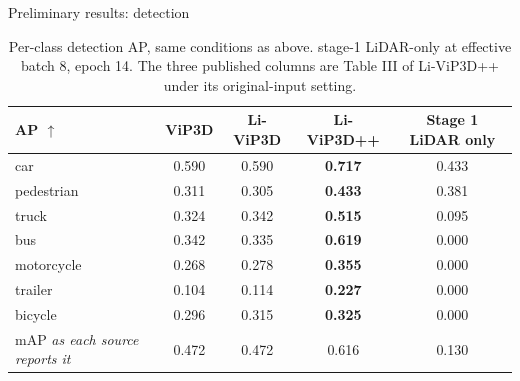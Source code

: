 \documentclass[aspectratio=169,11pt,t]{beamer}
\newcommand{\refcite}[1]{\textcolor{tuered}{\scriptsize\cite{#1}}}
\newcommand{\up}{$\uparrow$}
\begin{document}
\begin{frame}{Preliminary results: detection}
  \footnotesize
  \begin{table}
    \centering
    \caption{Per-class detection AP, same conditions as above. stage-1 LiDAR-only at effective batch 8, epoch 14. The three published
      columns are Table III of Li-ViP3D++\refcite{Halinkovic2026LiViP3DPP}
      under its original-input setting.}
    \scriptsize
    \setlength{\tabcolsep}{5pt}
    \begin{tabular}{lccc|c}
      \toprule
      AP \up & ViP3D\refcite{Gu2023ViP3D} & Li-ViP3D\refcite{Halinkovic2025LiViP3D}
             & Li-ViP3D++\refcite{Halinkovic2026LiViP3DPP} & \textbf{Stage 1 LiDAR only} \\
      \midrule
      car         & 0.590 & 0.590 & \textbf{0.717} & 0.433 \\
      pedestrian  & 0.311 & 0.305 & \textbf{0.433} & 0.381 \\
      truck       & 0.324 & 0.342 & \textbf{0.515} & 0.095 \\
      bus         & 0.342 & 0.335 & \textbf{0.619} & \alert{0.000} \\
      motorcycle  & 0.268 & 0.278 & \textbf{0.355} & \alert{0.000} \\
      trailer     & 0.104 & 0.114 & \textbf{0.227} & \alert{0.000} \\
      bicycle     & 0.296 & 0.315 & \textbf{0.325} & \alert{0.000} \\
      \midrule
      mAP \emph{as each source reports it} & 0.472 & 0.472 & 0.616 & 0.130 \\
      \bottomrule
    \end{tabular}
  \end{table}
  \vspace{-0.4em}
\end{frame}
\end{document}
